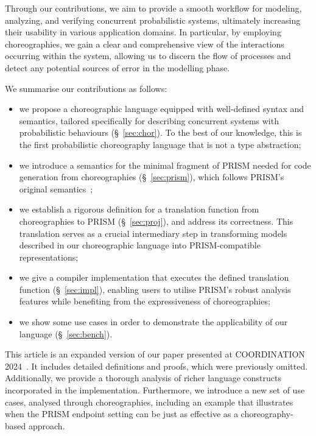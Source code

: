 Through our contributions, we aim to provide a smooth workflow for
modeling, analyzing, and verifying concurrent probabilistic systems,
ultimately increasing their usability in various application domains.
%
In particular, by employing choreographies, we gain a clear and
comprehensive view of the interactions occurring within the system,
allowing us to discern the flow of processes and detect any potential
sources of error in the modelling phase.


 We summarise our contributions as
follows:
\begin{itemize} 
\item we propose a choreographic language equipped with well-defined
  syntax and semantics, tailored specifically for describing
  concurrent systems with probabilistic behaviours
  (\S~\ref{sec:chor}). To the best of our knowledge, this is the first
  probabilistic choreography language that is not a type abstraction;

\item we introduce a semantics for the minimal fragment of PRISM
  needed for code generation from choreographies (\S~\ref{sec:prism}),
  which follows PRISM's original semantics~\cite{PRISMdoc};

\item we establish a rigorous definition for a translation function
  from choreographies to PRISM (\S~\ref{sec:proj}), and address its
  correctness. This translation serves as a crucial intermediary step
  in transforming models described in our choreographic language into
  PRISM-compatible representations;

\item we give a compiler implementation that executes the defined
  translation function (\S~\ref{sec:impl}),
  enabling users to utilise PRISM's robust analysis features while
  benefiting from the expressiveness of choreographies;

\item we show some use cases in order to demonstrate the applicability
  of our language (\S~\ref{sec:bench}).
\end{itemize}

%
This article is an expanded version of our paper presented at
COORDINATION 2024~\cite{CV24}. It includes detailed definitions and
proofs, which were previously omitted. Additionally, we provide a
thorough analysis of richer language constructs incorporated in the
implementation. Furthermore, we introduce a new set of use cases,
analysed through choreographies, including an example that illustrates
when the PRISM endpoint setting can be just as effective as a
choreography-based approach.


